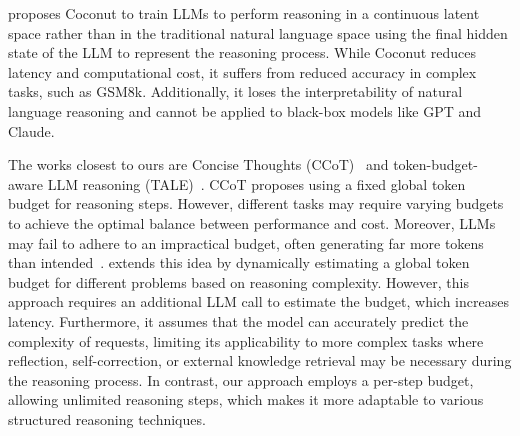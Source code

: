 \citet{latent-cot} proposes Coconut to train LLMs to perform reasoning in a continuous latent space rather than in the traditional natural language space using the final hidden state of the LLM to represent the reasoning process. 
While Coconut reduces latency and computational cost, it suffers from reduced accuracy in complex tasks, such as GSM8k. Additionally, it loses the interpretability of natural language reasoning and cannot be applied to black-box models like GPT and Claude.

The works closest to ours are Concise Thoughts (CCoT)~\cite{ccot} and token-budget-aware LLM reasoning (TALE)~\cite{budget}.
CCoT proposes using a fixed global token budget for reasoning steps. However, different tasks may require varying budgets to achieve the optimal balance between performance and cost. Moreover, LLMs may fail to adhere to an impractical budget, often generating far more tokens than intended~\cite{budget}.
\citet{budget} extends this idea by dynamically estimating a global token budget for different problems based on reasoning complexity. However, this approach requires an additional LLM call to estimate the budget, which increases latency. Furthermore, it assumes that the model can accurately predict the complexity of requests, limiting its applicability to more complex tasks where reflection, self-correction, or external knowledge retrieval may be necessary during the reasoning process. In contrast, our approach employs a per-step budget, allowing unlimited reasoning steps, which makes it more adaptable to various structured reasoning techniques.
